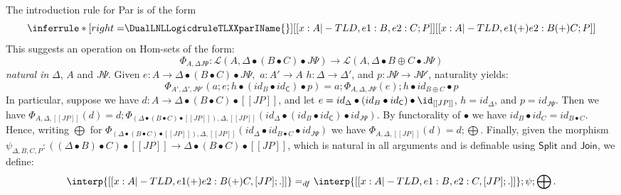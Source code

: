 The introduction rule for Par is of the form 
\[
\inferrule* [right=$\DualLNLLogicdruleTLXXparIName{}$] {
  [[x : A |-TL D,e1 : B,e2 : C;P]]
}{[[x : A |-TL D,e1 (+) e2 : B (+) C;P]]}
\]
This suggests an operation on Hom-sets of the form:
$$
\Phi_{A, \Delta J\Psi}: \mathcal{L}(A, \Delta \bullet (B \bullet C) \bullet J\Psi) \rightarrow 
\mathcal{L}(A, \Delta\bullet B\oplus C \bullet J\Psi)
$$
{\em natural in} $\Delta$, $A$ and $J\Psi$. Given 
$e: A\rightarrow \Delta \bullet (B\bullet C)\bullet J\Psi,$ $a: A' \rightarrow A$
 $h: \Delta\rightarrow\Delta'$, and  $p: J\Psi\rightarrow J\Psi'$, naturality yields:
$$
\Phi_{A', \Delta',J\Psi'}(a; e; h\bullet (id_B\bullet id_{\mathsf{C}}) \bullet p) = a; \Phi_{A, \Delta, J\Psi}(e); h\bullet id_{B\oplus C}\bullet p
$$
In particular, suppose we have $d: A \rightarrow \Delta\bullet (B\bullet C) \bullet [[J P]]$,
and let $e = id_{\Delta} \bullet (id_B \bullet id_{\mathsf{C}}) \bullet \id_{[[J P]]}$,
$h = id_{\Delta}$, and $p = id_{J\Psi}$. Then we have
$\Phi_{A, \Delta, [[J P]]}(d) = d; \Phi_{(\Delta \bullet (B \bullet C) \bullet [[J P]]),\Delta,[[J P]]} (id_{\Delta}\bullet (id_B \bullet id_{\mathsf{C}}) \bullet id_{J\Psi})$.
By functorality of $\bullet$ we have $id_{B}\bullet id_{C} = id_{B\bullet C}$. Hence, writing  
$\bigoplus$ for $\Phi_{(\Delta \bullet (B \bullet C) \bullet [[J P]]),\Delta,[[J P]]} (id_{\Delta}\bullet id_{B \bullet C} \bullet id_{J\Psi})$ we have 
$\Phi_{A, \Delta,[[J P]]}(d) = d; \bigoplus$. Finally, given the morphism $\psi_{\Delta,B,C,P} : ((\Delta \bullet B) \bullet C) \bullet [[J P]] \rightarrow \Delta \bullet (B \bullet C) \bullet [[J P]]$, which is natural in all arguments and is definable using $\mathsf{Split}$ and $\mathsf{Join}$, we define:
$$
\interp{[[x:A |-TL  D, e1 (+) e2 : B (+) C, [ J P ];. ]]} =_{df} \interp{[[x:A |-TL  D, e1 : B, e2 : C, [ J P ];. ]]};\psi;\bigoplus.
$$

